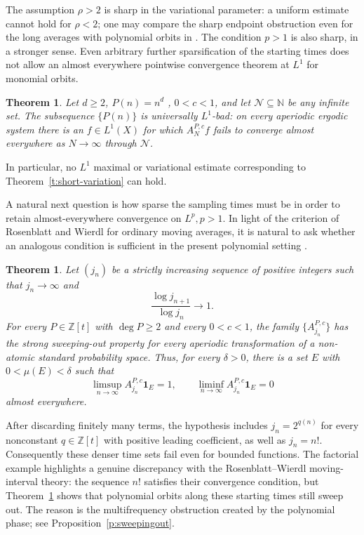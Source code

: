 \documentclass[12pt,leqno]{amsart}
\newcounter{counter}
\newcounter{counter2}
\numberwithin{equation}{section}
\numberwithin{counter2}{section}
\newtheorem{theorem}[counter]{Theorem}
\newcounter{theorem}
\theoremstyle{definition}
\theoremstyle{plain}
\begin{document}
The assumption $\rho>2$ is sharp in the variational parameter: a uniform estimate
 cannot hold for $\rho<2$; one may compare the sharp endpoint obstruction even
for the long averages with polynomial orbits in \cite{Krause2014}.  The condition $p>1$ is also sharp, in a stronger sense.  Even arbitrary further
sparsification of the starting times does not allow an almost everywhere pointwise convergence theorem at $L^1$ for
monomial orbits.

\begin{theorem}\label{t:short-l1-bad}
	Let $d\geq2$, $P(n)=n^d$ , $0<c<1$, and let
	$\mathcal N\subseteq\mathbb N$ be any infinite set.  The subsequence $\{P(n)\}$ 
    is universally $L^1$-bad: on every 
	aperiodic ergodic system there is an $f\in L^1(X)$ for which
	$A_N^{P,c}f$ fails to converge almost everywhere  as 
	$N\to\infty$ through $\mathcal N$.
\end{theorem}

In particular, no $L^1$ maximal or variational estimate corresponding to
Theorem~\ref{t:short-variation} can hold. 


A natural next question is how sparse the sampling times must be in order to retain almost-everywhere convergence on $L^p, p>1$. In light of the criterion of Rosenblatt and Wierdl for ordinary moving averages, it is natural to ask whether an analogous condition is sufficient in the present polynomial setting \cite{Rosenblatt_Wierdl_1992}.


\begin{theorem}\label{t:dense-sweeping}
	Let $(j_n)$ be a strictly increasing sequence of positive integers such that
	$j_n\to\infty$ and
	\[
	\frac{\log j_{n+1}}{\log j_n}\longrightarrow1.
	\]
	For every $P\in\mathbb Z[t]$ with $\deg P\geq2$ and every $0<c<1$,
	the family $\{A_{j_n}^{P,c}\}$ has the strong sweeping-out
	property for every aperiodic transformation of a non-atomic standard
	probability space.  Thus, for every
	$\delta>0$, there is a set $E$ with $0<\mu(E)<\delta$ such that
	\[
	\limsup_{n\to\infty}A_{j_n}^{P,c}\mathbf 1_E=1,
	\qquad
	\liminf_{n\to\infty}A_{j_n}^{P,c}\mathbf 1_E=0
	\]
	almost everywhere.
\end{theorem}

After discarding finitely many terms, the hypothesis includes
$j_n=2^{q(n)}$ for every nonconstant
$q\in\mathbb Z[t]$ with positive leading coefficient, as well as
$j_n=n!$.  Consequently these denser time sets fail even for bounded
functions. The factorial example highlights a genuine discrepancy with the
Rosenblatt--Wierdl moving-interval theory: the sequence \(n!\) satisfies their convergence
condition, but Theorem~\ref{t:dense-sweeping} shows that polynomial orbits along
these starting times still sweep out. The reason is the multifrequency obstruction created by the
polynomial phase; see Proposition~\ref{p:sweepingout}.
\end{document}
